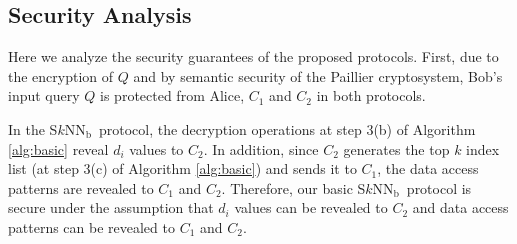 \documentclass{article}
\newcommand{\sknnb}{S$k$NN$_\textrm{b}$}
\begin{document}
\begin{algorithm}[!htbp]
\begin{algorithmic}[1]
\begin{comment}
\STATE $C_2$:
\begin{enumerate}\itemsep=-1pt
     \item[(a).] Receive $\langle  \gamma_1,\dots, \gamma_k \rangle$ from $C_1$
     \item[(b).] Compute $ \gamma'_1 \gets D_{sk}(\gamma_1),\dots, \gamma'_k \gets D_{sk}(\gamma_k)$ 
     \item[(c).] Send $\langle \gamma'_1,\dots, \gamma'_k \rangle$ to Bob 
 \end{enumerate}

\STATE  Bob:
\begin{enumerate}\itemsep=-1pt
     \item[(a).] Receive $r$ from $C_1$ and $\langle \gamma'_1,\dots, \gamma'_k \rangle$ from $C_2$     
     \item[(b).] $t'_1 \gets \gamma'_1 - r,\dots,t'_k \gets \gamma'_k -r$
\end{enumerate}
\end{comment}
\end{algorithmic}
\caption{S$k$NN$_\textrm{m}(E_{pk}(T), Q) \rightarrow \langle t'_1, \ldots,t'_k\rangle$}
\label{alg:main}
\end{algorithm} 



\subsection{Security Analysis} 
Here we analyze the security guarantees of the proposed protocols. First, 
due to the encryption of $Q$ and by semantic security 
of the Paillier cryptosystem, Bob's input query $Q$ is protected from 
Alice, $C_1$ and $C_2$ in both protocols. 

In the \sknnb~protocol, 
the decryption operations at step 3(b) of Algorithm \ref{alg:basic} 
reveal $d_i$ values to $C_2$. In addition, since $C_2$ generates the top $k$ index list (at 
step 3(c) of Algorithm \ref{alg:basic}) and sends it to $C_1$, the data access patterns are revealed 
to $C_1$ and $C_2$. Therefore, our basic \sknnb~protocol is secure under 
the assumption that $d_i$ values can be revealed to $C_2$ and 
data access patterns can be revealed to $C_1$ and $C_2$. 
\end{document}
